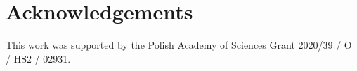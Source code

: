 \documentclass[twocolumn, switch, a4paper]{article} %
\begin{document}
\footnotesize
\section*{Acknowledgements}

This work was supported by the Polish Academy of Sciences Grant 2020/39 / O /
HS2 / 02931.

\FloatBarrier
\normalsize



\end{document}
